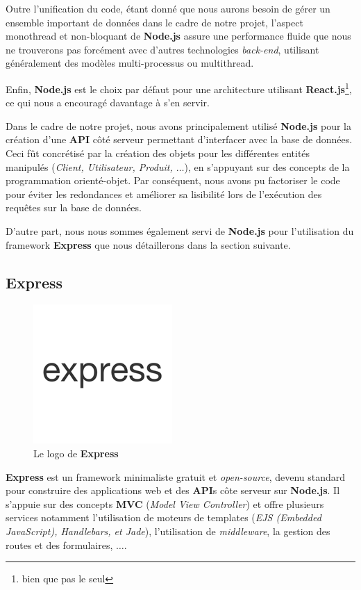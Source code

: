 \documentclass[a4paper,12pt]{report}
\theoremstyle{break}
\theoremstyle{break}
\theoremstyle{break}
\theoremstyle{break}
\theoremstyle{definition}
\theoremstyle{remark}
\begin{document}
Outre l'unification du code, étant donné que nous aurons besoin de gérer un ensemble important de données dans le cadre de notre projet, l'aspect monothread et non-bloquant de \textbf{Node.js} assure une performance fluide que nous ne trouverons pas forcément avec d'autres technologies \textit{back-end}, utilisant généralement des modèles multi-processus ou multithread.

Enfin, \textbf{Node.js} est le choix par défaut pour une architecture utilisant \textbf{React.js}\footnote{bien que pas le seul}, ce qui nous a encouragé davantage à s'en servir.

Dans le cadre de notre projet, nous avons principalement utilisé \textbf{Node.js} pour la création d'une \textbf{API} côté serveur permettant d'interfacer avec la base de données. Ceci fût concrétisé par la création des objets pour les différentes entités manipulés (\textit{Client, Utilisateur, Produit, $\dots$}), en s'appuyant sur des concepts de la programmation orienté-objet. Par conséquent, nous avons pu factoriser le code pour éviter les redondances et  améliorer sa lisibilité lors de l'exécution des requêtes sur la base de données.

D'autre part, nous nous sommes également servi de \textbf{Node.js} pour l'utilisation du framework \textbf{Express} que nous détaillerons dans la section suivante.
\subsection{Express}
\begin{figure}[!ht]
  \centering
  \includegraphics[scale=0.4]{images/express_icon.png}
  \caption{Le logo de \textbf{Express}}
\end{figure}

\textbf{Express} est un framework minimaliste gratuit et \textit{open-source}, devenu standard pour construire des applications web et des \textbf{API}s côte serveur sur \textbf{Node.js}. Il s'appuie sur des concepts \textbf{MVC} (\textit{Model View Controller}) et offre plusieurs services notamment l'utilisation de moteurs de templates (\textit{EJS (Embedded JavaScript), Handlebars, et Jade}), l'utilisation de \textit{middleware}, la gestion des routes et des formulaires, $\dots$.
\end{document}
